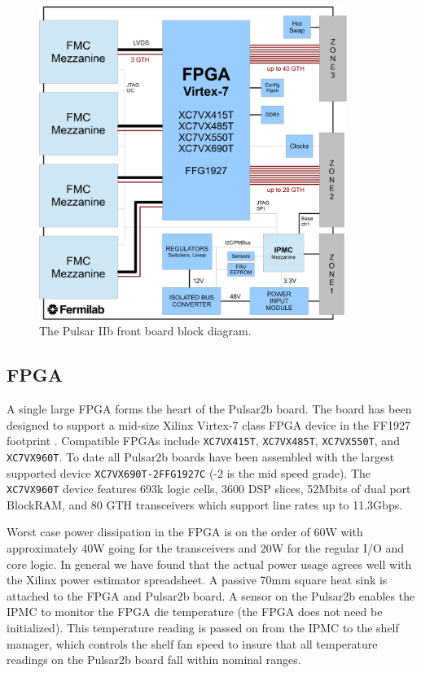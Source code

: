 \documentclass[letterpaper]{article}
\begin{document}
\begin{figure}
\centering
\includegraphics[width=10cm]{pulsar2b_block.png}
\caption{The Pulsar IIb front board block diagram.}
\label{pulsar2b_block}
\end{figure}

\subsection{FPGA}

A single large FPGA forms the heart of the Pulsar2b board.  The board has been designed to support a mid-size Xilinx Virtex-7 class FPGA device in the FF1927 footprint \cite{xilinx}.  Compatible FPGAs include \texttt{XC7VX415T}, \texttt{XC7VX485T}, \texttt{XC7VX550T}, and \texttt{XC7VX960T}.  To date all Pulsar2b boards have been assembled with the largest supported device \texttt{XC7VX690T-2FFG1927C} (-2 is the mid speed grade).  The \texttt{XC7VX960T} device features 693k logic cells, 3600 DSP slices, 52Mbits of dual port BlockRAM, and 80 GTH transceivers which support line rates up to 11.3Gbps.  

Worst case power dissipation in the FPGA is on the order of 60W with approximately 40W going for the transceivers and 20W for the regular I/O and core logic.  In general we have found that the actual power usage agrees well with the Xilinx power estimator spreadsheet.  A passive 70mm square heat sink is attached to the FPGA and Pulsar2b board.  A sensor on the Pulsar2b enables the IPMC to monitor the FPGA die temperature (the FPGA does not need be initialized).  This temperature reading is passed on from the IPMC to the shelf manager, which controls the shelf fan speed to insure that all temperature readings on the Pulsar2b board fall within nominal ranges.
\end{document}
